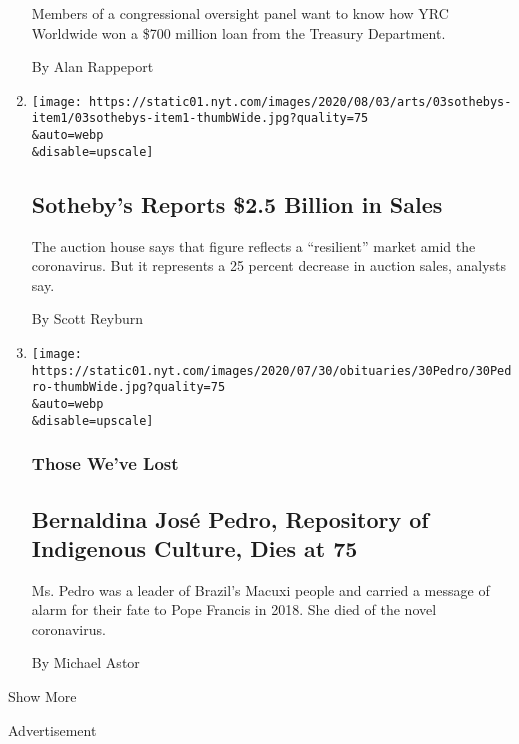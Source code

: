 \begin{enumerate}
  Members of a congressional oversight panel want to know how YRC
  Worldwide won a \$700 million loan from the Treasury Department.

  By Alan Rappeport
\item
  \href{/2020/08/03/arts/design/sothebys-sales.html}{}

  \texttt{[image: https://static01.nyt.com/images/2020/08/03/arts/03sothebys-item1/03sothebys-item1-thumbWide.jpg?quality=75\\\&auto=webp\\\&disable=upscale]}

  \hypertarget{sothebys-reports-25-billion-in-sales}{%
  \subsection{Sotheby's Reports \$2.5 Billion in
  Sales}\label{sothebys-reports-25-billion-in-sales}}

  The auction house says that figure reflects a ``resilient'' market
  amid the coronavirus. But it represents a 25 percent decrease in
  auction sales, analysts say.

  By Scott Reyburn
\item
  \href{/2020/08/03/obituaries/bernaldina-jose-pedro-dead-coronavirus.html}{}

  \texttt{[image: https://static01.nyt.com/images/2020/07/30/obituaries/30Pedro/30Pedro-thumbWide.jpg?quality=75\\\&auto=webp\\\&disable=upscale]}

  \hypertarget{those-weve-lost}{%
  \subsubsection{Those We've Lost}\label{those-weve-lost}}

  \hypertarget{bernaldina-josuxe9-pedro-repository-of-indigenous-culture-dies-at-75}{%
  \subsection{Bernaldina José Pedro, Repository of Indigenous Culture,
  Dies at
  75}\label{bernaldina-josuxe9-pedro-repository-of-indigenous-culture-dies-at-75}}

  Ms. Pedro was a leader of Brazil's Macuxi people and carried a message
  of alarm for their fate to Pope Francis in 2018. She died of the novel
  coronavirus.

  By Michael Astor
\end{enumerate}

Show More

Advertisement

